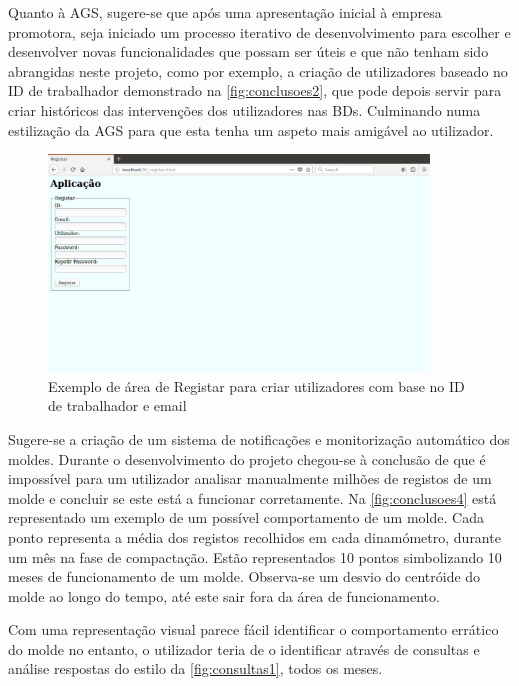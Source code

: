 \documentclass[11pt,twoside,a4paper]{report}
\begin{document}
Quanto à AGS, sugere-se que após uma apresentação inicial à empresa promotora, seja iniciado um processo iterativo de desenvolvimento para escolher e desenvolver novas funcionalidades que possam ser úteis e que não tenham sido abrangidas neste projeto, como por exemplo, a criação de utilizadores baseado no ID de trabalhador demonstrado na \autoref{fig:conclusoes2}, que pode depois servir para criar históricos das intervenções dos utilizadores nas BDs. Culminando numa estilização da AGS para que esta tenha um aspeto mais amigável ao utilizador.
\begin{figure}[H]
	\begin{center}
		\includegraphics[width=0.9\textwidth]{futuro02} %
		\caption{Exemplo de área de Registar para criar utilizadores com base no ID de trabalhador e email}
		\label{fig:conclusoes2}
	\end{center}
\end{figure}
Sugere-se a criação de um sistema de notificações e monitorização automático dos moldes. Durante o desenvolvimento do projeto chegou-se à conclusão de que é impossível para um utilizador analisar manualmente milhões de registos de um molde e concluir se este está a funcionar corretamente. Na \autoref{fig:conclusoes4} está representado um exemplo de um possível comportamento de um molde. Cada ponto representa a média dos registos recolhidos em cada dinamómetro, durante um mês na fase de compactação. Estão representados 10 pontos simbolizando 10 meses de funcionamento de um molde. Observa-se um desvio do centróide do molde ao longo do tempo, até este sair fora da área de funcionamento.\par 
Com uma representação visual parece fácil identificar o comportamento errático do molde no entanto, o utilizador teria de o identificar através de consultas e análise respostas do estilo da \autoref{fig:consultas1}, todos os meses.
\end{document}

